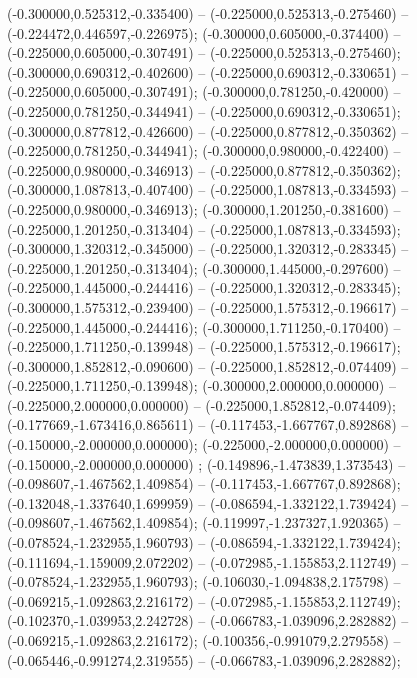  (-0.300000,0.525312,-0.335400) -- (-0.225000,0.525313,-0.275460) -- (-0.224472,0.446597,-0.226975);
 (-0.300000,0.605000,-0.374400) -- (-0.225000,0.605000,-0.307491) -- (-0.225000,0.525313,-0.275460);
 (-0.300000,0.690312,-0.402600) -- (-0.225000,0.690312,-0.330651) -- (-0.225000,0.605000,-0.307491);
 (-0.300000,0.781250,-0.420000) -- (-0.225000,0.781250,-0.344941) -- (-0.225000,0.690312,-0.330651);
 (-0.300000,0.877812,-0.426600) -- (-0.225000,0.877812,-0.350362) -- (-0.225000,0.781250,-0.344941);
 (-0.300000,0.980000,-0.422400) -- (-0.225000,0.980000,-0.346913) -- (-0.225000,0.877812,-0.350362);
 (-0.300000,1.087813,-0.407400) -- (-0.225000,1.087813,-0.334593) -- (-0.225000,0.980000,-0.346913);
 (-0.300000,1.201250,-0.381600) -- (-0.225000,1.201250,-0.313404) -- (-0.225000,1.087813,-0.334593);
 (-0.300000,1.320312,-0.345000) -- (-0.225000,1.320312,-0.283345) -- (-0.225000,1.201250,-0.313404);
 (-0.300000,1.445000,-0.297600) -- (-0.225000,1.445000,-0.244416) -- (-0.225000,1.320312,-0.283345);
 (-0.300000,1.575312,-0.239400) -- (-0.225000,1.575312,-0.196617) -- (-0.225000,1.445000,-0.244416);
 (-0.300000,1.711250,-0.170400) -- (-0.225000,1.711250,-0.139948) -- (-0.225000,1.575312,-0.196617);
 (-0.300000,1.852812,-0.090600) -- (-0.225000,1.852812,-0.074409) -- (-0.225000,1.711250,-0.139948);
 (-0.300000,2.000000,0.000000) -- (-0.225000,2.000000,0.000000) -- (-0.225000,1.852812,-0.074409);
 (-0.177669,-1.673416,0.865611) -- (-0.117453,-1.667767,0.892868) -- (-0.150000,-2.000000,0.000000);
 (-0.225000,-2.000000,0.000000) -- (-0.150000,-2.000000,0.000000) ;
 (-0.149896,-1.473839,1.373543) -- (-0.098607,-1.467562,1.409854) -- (-0.117453,-1.667767,0.892868);
 (-0.132048,-1.337640,1.699959) -- (-0.086594,-1.332122,1.739424) -- (-0.098607,-1.467562,1.409854);
 (-0.119997,-1.237327,1.920365) -- (-0.078524,-1.232955,1.960793) -- (-0.086594,-1.332122,1.739424);
 (-0.111694,-1.159009,2.072202) -- (-0.072985,-1.155853,2.112749) -- (-0.078524,-1.232955,1.960793);
 (-0.106030,-1.094838,2.175798) -- (-0.069215,-1.092863,2.216172) -- (-0.072985,-1.155853,2.112749);
 (-0.102370,-1.039953,2.242728) -- (-0.066783,-1.039096,2.282882) -- (-0.069215,-1.092863,2.216172);
 (-0.100356,-0.991079,2.279558) -- (-0.065446,-0.991274,2.319555) -- (-0.066783,-1.039096,2.282882);
